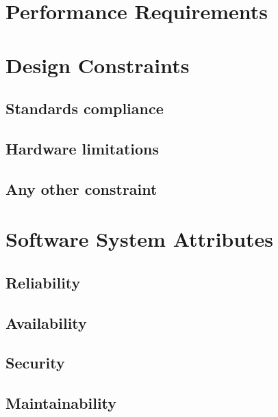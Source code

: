 \documentclass{/D:/Users/corsair-dragon/Documents/Github - Mario/CelaCelaCogollo/RASD/LaTeXCode/src/Configuration_Files/PoliMi3i_thesis.cls}
\begin{document}
    \section{Performance Requirements}\label{sec:performance_requirements}


    \section{Design Constraints}\label{sec:design_constraints}

    \subsection{Standards compliance}\label{subsec:standards_compliance}

    \subsection{Hardware limitations}\label{subsec:hardware_limitations}

    \subsection{Any other constraint}\label{subsec:any_other_constraint}


    \section{Software System Attributes}\label{sec:software_system_attributes}

    \subsection{Reliability}\label{subsec:reliability}

    \subsection{Availability}\label{subsec:availability}

    \subsection{Security}\label{subsec:security}

    \subsection{Maintainability}\label{subsec:maintainability}
\end{document}
